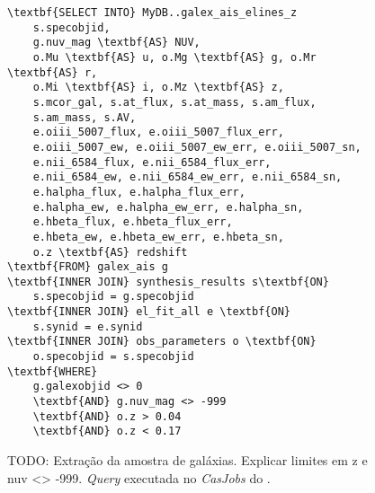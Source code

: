 \begin{figure}
\begin{Verbatim}[commandchars=\\\{\}]
\textbf{SELECT INTO} MyDB..galex_ais_elines_z
	s.specobjid,
	g.nuv_mag \textbf{AS} NUV,
	o.Mu \textbf{AS} u, o.Mg \textbf{AS} g, o.Mr \textbf{AS} r,
	o.Mi \textbf{AS} i, o.Mz \textbf{AS} z,
	s.mcor_gal, s.at_flux, s.at_mass, s.am_flux,
	s.am_mass, s.AV,
	e.oiii_5007_flux, e.oiii_5007_flux_err,
	e.oiii_5007_ew, e.oiii_5007_ew_err, e.oiii_5007_sn,
	e.nii_6584_flux, e.nii_6584_flux_err,
	e.nii_6584_ew, e.nii_6584_ew_err, e.nii_6584_sn,
	e.halpha_flux, e.halpha_flux_err,
	e.halpha_ew, e.halpha_ew_err, e.halpha_sn,
	e.hbeta_flux, e.hbeta_flux_err,
	e.hbeta_ew, e.hbeta_ew_err, e.hbeta_sn,
	o.z \textbf{AS} redshift
\textbf{FROM} galex_ais g
\textbf{INNER JOIN} synthesis_results s\textbf{ON}
	s.specobjid = g.specobjid
\textbf{INNER JOIN} el_fit_all e \textbf{ON}
	s.synid = e.synid
\textbf{INNER JOIN} obs_parameters o \textbf{ON}
	o.specobjid = s.specobjid
\textbf{WHERE}
	g.galexobjid <> 0
	\textbf{AND} g.nuv_mag <> -999
	\textbf{AND} o.z > 0.04
	\textbf{AND} o.z < 0.17
\end{Verbatim}
	\caption[Extração da amostra de galáxias.]
	{TODO: Extração da amostra de galáxias. Explicar limites em z e nuv <> -999.
	{\em Query} executada no {\em CasJobs} do \starlight.}
	\label{fig:QuerySampleAIS}
\end{figure}


